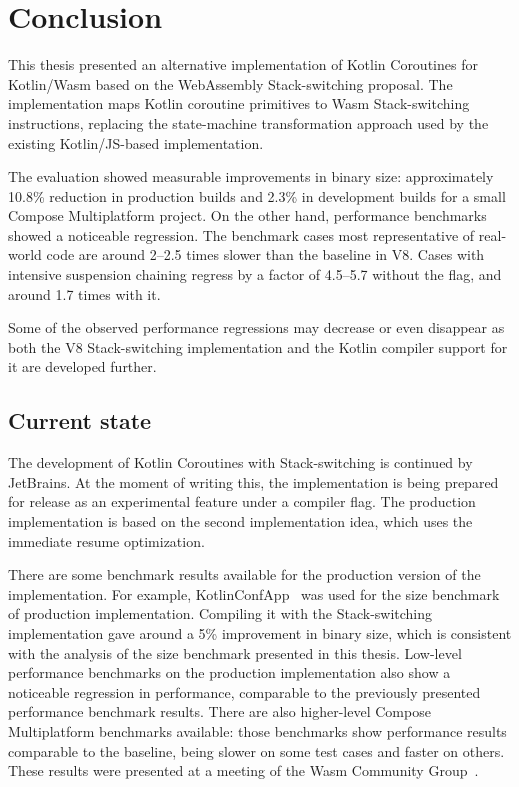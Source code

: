 \chapter{Conclusion}
\label{ch:conclusion}

This thesis presented an alternative implementation of Kotlin Coroutines for Kotlin/Wasm based on the
WebAssembly Stack-switching proposal. The implementation maps Kotlin coroutine primitives to
Wasm Stack-switching instructions, replacing the state-machine transformation approach used by the
existing Kotlin/JS-based implementation.

The evaluation showed measurable improvements in binary size: approximately 10.8\% reduction in production builds and
2.3\% in development builds for a small Compose Multiplatform project. On the other hand, performance benchmarks showed
a noticeable regression. The benchmark cases most representative of real-world code are around 2--2.5 times slower than the
baseline in V8. Cases with intensive suspension chaining regress by a factor of 4.5--5.7 without the
 flag, and around 1.7 times with it.

Some of the observed performance regressions may decrease or even disappear as both the V8 Stack-switching
implementation and the Kotlin compiler support for it are developed further.

\section*{Current state}

The development of Kotlin Coroutines with Stack-switching is continued by JetBrains.
At the moment of writing this, the implementation is being prepared for
release as an experimental feature under a compiler flag. The production
implementation is based on the second implementation idea, which uses the immediate
resume optimization.

There are some benchmark results available for the production version of the implementation.
For example, KotlinConfApp~\cite{kotlinconf-app} was used for the size benchmark of production implementation.
Compiling it with the Stack-switching implementation gave around a 5\% improvement in binary size, which is consistent
with the analysis of the size benchmark presented in this thesis. Low-level performance benchmarks on the production
implementation also show a noticeable regression in performance, comparable to the previously presented performance
benchmark results. There are also higher-level Compose Multiplatform benchmarks available: those benchmarks show
performance results comparable to the baseline, being slower on some test cases and
faster on others. These results were presented at a meeting of the Wasm Community
Group~\cite{wasm-stack-meeting-2026}.

